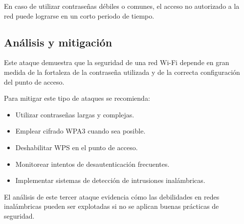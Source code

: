 En caso de utilizar contraseñas débiles o comunes, el acceso no autorizado a la red puede lograrse en un corto periodo de tiempo.

\subsection{Análisis y mitigación}

Este ataque demuestra que la seguridad de una red Wi-Fi depende en gran medida de la fortaleza de la contraseña utilizada y de la correcta configuración del punto de acceso.

Para mitigar este tipo de ataques se recomienda:

\begin{itemize}
    \item Utilizar contraseñas largas y complejas.
    \item Emplear cifrado WPA3 cuando sea posible.
    \item Deshabilitar WPS en el punto de acceso.
    \item Monitorear intentos de desautenticación frecuentes.
    \item Implementar sistemas de detección de intrusiones inalámbricas.
\end{itemize}

El análisis de este tercer ataque evidencia cómo las debilidades en redes inalámbricas pueden ser explotadas si no se aplican buenas prácticas de seguridad.
